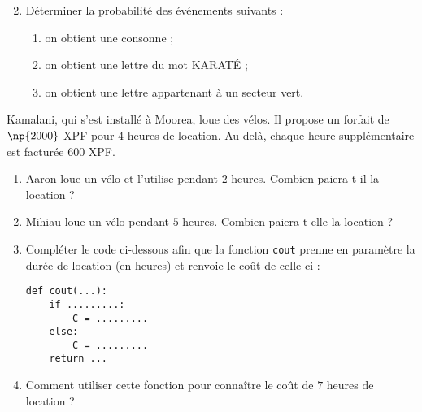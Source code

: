 \documentclass[a4paper,dvipsnames]{article}
\begin{document}
\begin{enumerate}
  \setcounter{enumi}{1}
  \item Déterminer la probabilité des événements suivants :
  \begin{enumerate}
    \item \og{}on obtient une consonne\fg{} ;
    \item \og{}on obtient une lettre du mot \textsc{KARATÉ}\fg{} ;
    \item \og{}on obtient une lettre appartenant à un secteur vert\fg{}.
  \end{enumerate}
\end{enumerate}

\bigskip

\exo[3 points] Kamalani, qui s'est installé à Moorea, loue des vélos. Il propose un forfait de $\np{2000}$ XPF pour $4$ heures de location. Au-delà, chaque heure supplémentaire est facturée $600$ XPF.
\begin{enumerate}
  \item Aaron loue un vélo et l'utilise pendant $2$ heures. Combien paiera-t-il la location ?
  \item Mihiau loue un vélo pendant $5$ heures. Combien paiera-t-elle la location ?
  \item Compléter le code ci-dessous afin que la fonction \texttt{cout} prenne en paramètre la durée de location (en heures) et renvoie le coût de celle-ci :
    \begin{verbatim}
def cout(...):
    if .........:
        C = .........
    else:
        C = .........
    return ...
    \end{verbatim}
  \item Comment utiliser cette fonction pour connaître le coût de $7$ heures de location ?
\end{enumerate}
\end{document}
